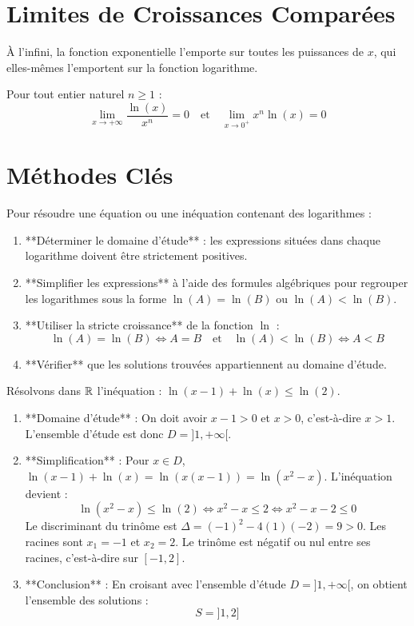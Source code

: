 \section{Limites de Croissances Comparées}

À l'infini, la fonction exponentielle l'emporte sur toutes les puissances de $x$, qui elles-mêmes l'emportent sur la fonction logarithme.

\begin{theoreme}
Pour tout entier naturel $n \ge 1$ :
\[
\lim_{x \to +\infty} \frac{\ln(x)}{x^n} = 0 \quad \text{et} \quad \lim_{x \to 0^+} x^n \ln(x) = 0
\]
\end{theoreme}

\section{Méthodes Clés}

\begin{methode}
Pour résoudre une équation ou une inéquation contenant des logarithmes :
\begin{enumerate}
    \item **Déterminer le domaine d'étude** : les expressions situées dans chaque logarithme doivent être strictement positives.
    \item **Simplifier les expressions** à l'aide des formules algébriques pour regrouper les logarithmes sous la forme $\ln(A) = \ln(B)$ ou $\ln(A) < \ln(B)$.
    \item **Utiliser la stricte croissance** de la fonction $\ln$ :
    \[
    \ln(A) = \ln(B) \iff A = B \quad \text{et} \quad \ln(A) < \ln(B) \iff A < B
    \]
    \item **Vérifier** que les solutions trouvées appartiennent au domaine d'étude.
\end{enumerate}
\end{methode}

\begin{exemple}
Résolvons dans $\mathbb{R}$ l'inéquation : $\ln(x-1) + \ln(x) \le \ln(2)$.
\begin{enumerate}
    \item **Domaine d'étude** : On doit avoir $x-1 > 0$ et $x > 0$, c'est-à-dire $x > 1$. L'ensemble d'étude est donc $D = ]1, +\infty[$.
    \item **Simplification** : Pour $x \in D$, $\ln(x-1) + \ln(x) = \ln(x(x-1)) = \ln(x^2-x)$. L'inéquation devient :
    \[
    \ln(x^2-x) \le \ln(2) \iff x^2 - x \le 2 \iff x^2 - x - 2 \le 0
    \]
    Le discriminant du trinôme est $\Delta = (-1)^2 - 4(1)(-2) = 9 > 0$. Les racines sont $x_1 = -1$ et $x_2 = 2$.
    Le trinôme est négatif ou nul entre ses racines, c'est-à-dire sur $[-1, 2]$.
    \item **Conclusion** : En croisant avec l'ensemble d'étude $D = ]1, +\infty[$, on obtient l'ensemble des solutions :
    \[
    S = ]1, 2]
    \]
\end{enumerate}
\end{exemple}

